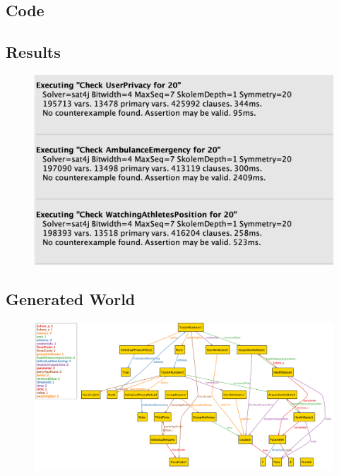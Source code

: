 \subsection{Code}


\subsection{Results}
\begin{figure}[H]
\centering
\includegraphics[scale=0.7]{Images/alloyResult.png}
\end{figure}
\subsection{Generated World}
\begin{figure}[H]
\centering
\includegraphics[scale=0.4]{Images/alloyGeneratedWorld.png}
\end{figure}